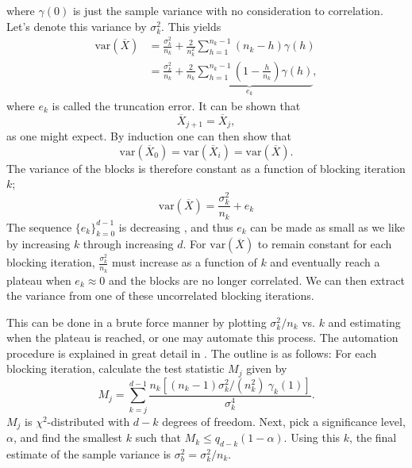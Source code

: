\documentclass[
    a4paper, aps, twocolumn, floatfix, superscriptaddress,
    nofootinbib]{revtex4-1}
\begin{document}
where $\gamma(0)$ is just the sample variance with no consideration to correlation. Let's denote this variance by $\sigma_k^2$. This yields
\begin{align}
 \text{var}(\overline{X}) &= \frac{\sigma_k^2}{n_k} + \frac{2}{n_k^2} \sum_{h=1}^{n_k-1} (n_k-h)\gamma(h) \\
 &= \frac{\sigma_k^2}{n_k} + \underbrace{\frac{2}{n_k} \sum_{h=1}^{n_k-1}\left(1-\frac{h}{n_k} \right) \gamma(h)}_{e_k},
\end{align}
where $e_k$ is called the truncation error. It can be shown that \cite{Stat.Phys.}
 \begin{equation}
     \overline{X}_{j+1} = \overline{X}_{j},
 \end{equation}
 as one might expect. By induction one can then show that 
 \begin{equation}
     \text{var}(\overline{X}_0) = \text{var}(\overline{X}_i) = \text{var}(\overline{X}).
 \end{equation}
 The variance of the blocks is therefore constant as a function of blocking iteration $k$;
 \begin{equation}
     \text{var}(\overline{X}) = \frac{\sigma_k^2}{n_k} + e_k
 \end{equation}
 The sequence $\{e_k\}_{k=0}^{d-1}$ is decreasing \cite{Jonsson}, and thus $e_k$ can be made as small as we like by increasing $k$ through increasing $d$. For $\text{var}(\overline{X})$ to remain constant for each blocking iteration, $\frac{\sigma_k^2}{n_k}$  must increase as a function of $k$ and eventually reach a plateau when $e_k \approx 0$ and the blocks are no longer correlated. We can then extract the variance from one of these uncorrelated blocking iterations. 
 
 This can be done in a brute force manner by plotting $\sigma_k^2/n_k$ vs. $k$ and estimating when the plateau is reached, or one may automate this process. The automation procedure is explained in great detail in \cite{Stat.Phys.}. The outline is as follows: For each blocking iteration, calculate the test statistic $M_j$ given by 
 \begin{equation}
     M_j = \sum_{k=j}^{d-1}\frac{n_k\left[(n_k-1) \sigma_k^2/(n_k^2) \ \gamma_k(1) \right]}{\sigma_k^4}.
 \end{equation}
$M_j$ is $\chi^2$-distributed with $d-k$ degrees of freedom. Next, pick a significance level, $\alpha$, and find the smallest $k$ such that $M_k \leq q_{d-k}(1-\alpha)$. Using this $k$, the final estimate of the sample variance is $\sigma_b^2 = \sigma_k^2/n_k$.
 
\end{document}
